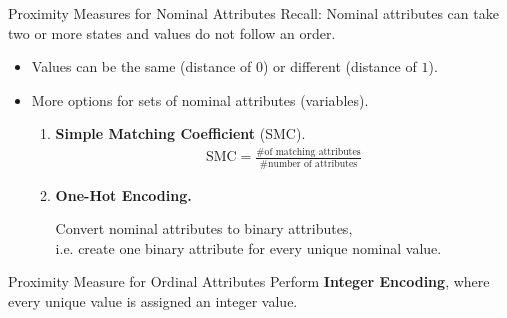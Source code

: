 \begin{frame}{Proximity Measures for Nominal Attributes}
  Recall: Nominal attributes can take two or more states and values do not follow an order.
  \begin{itemize}
  \item Values can be the same (distance of $0$) or different (distance of $1$).
  \item More options for sets of nominal attributes (variables).
    \begin{enumerate}
    \item \textbf{Simple Matching Coefficient} (SMC).
          \begin{align*}
      \text{SMC} = \frac{\# \text{of matching attributes}}{\# \text{number of attributes}}
          \end{align*}
        \item \textbf{One-Hot Encoding.}

          Convert nominal attributes to binary attributes,\\ i.e. create one
          binary attribute for every unique nominal value.
    \end{enumerate}
  \end{itemize}

  \vspace*{1em}
  \begin{block}{Proximity Measure for Ordinal Attributes}
    Perform \textbf{Integer Encoding}, where every unique value is assigned an integer value.
  \end{block}
\end{frame}

